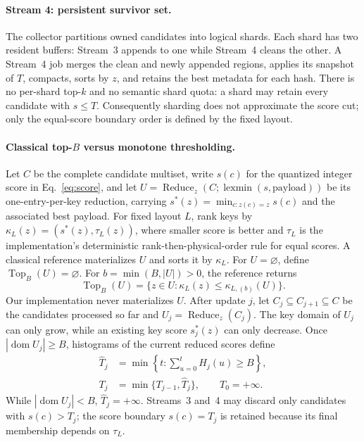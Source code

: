 \documentclass[10pt,twocolumn]{article}
\newcommand{\beam}{B}
\begin{document}
\paragraph{Stream 4: persistent survivor set.}
The collector partitions owned candidates into logical shards.  Each shard has
two resident buffers: Stream~3 appends to one while Stream~4 cleans the other.
A Stream~4 job merges the clean and newly appended regions, applies its snapshot
of $T$, compacts, sorts by $z$, and retains the best metadata for each hash.
There is no per-shard top-$k$ and no semantic shard quota: a shard may retain
every candidate with $s\leq T$. Consequently sharding does not approximate the
score cut; only the equal-score boundary order is defined by the fixed layout.

\paragraph{Classical top-$\beam$ versus monotone thresholding.}
Let $C$ be the complete candidate multiset, write $s(c)$ for the quantized
integer score in Eq.~\eqref{eq:score}, and let
$U=\operatorname{Reduce}_{z}(C;\operatorname{lexmin}(s,\mathrm{payload}))$ be
its one-entry-per-key reduction, carrying
$s^*(z)=\min_{c:z(c)=z}s(c)$ and the associated best payload.  For fixed layout
$L$, rank keys by $\kappa_L(z)=(s^*(z),\tau_L(z))$, where smaller score is
better and $\tau_L$ is the implementation's deterministic
rank-then-physical-order rule for equal scores.  A classical reference
materializes $U$ and sorts it by $\kappa_L$.
For $U=\varnothing$, define $\operatorname{Top}_{\beam}(U)=\varnothing$.
For $b=\min(\beam,|U|)>0$, the reference returns
\begin{equation}
 \operatorname{Top}_{\beam}(U)=
 \{z\in U:\kappa_L(z)\leq \kappa_{L,(b)}(U)\}.
 \label{eq:classical_topb}
\end{equation}
Our implementation never materializes $U$.  After update $j$, let
$C_j\subseteq C_{j+1}\subseteq C$ be the candidates processed so far and
$U_j=\operatorname{Reduce}_{z}(C_j)$.  The key domain of $U_j$ can only grow,
while an existing key score $s_j^*(z)$ can only decrease.  Once
$|\operatorname{dom}U_j|\geq\beam$, histograms of the current reduced scores
define
\begin{align}
 \widehat T_j&=\min\left\{t:\sum_{u=0}^{t}H_j(u)\geq\beam\right\},\nonumber\\
 T_j&=\min\{T_{j-1},\widehat T_j\},\qquad T_0=+\infty.
 \label{eq:online_threshold}
\end{align}
While $|\operatorname{dom}U_j|<\beam$, $\widehat T_j=+\infty$.
Streams~3 and~4 may discard only candidates with $s(c)>T_j$; the score boundary
$s(c)=T_j$ is retained because its final membership depends on $\tau_L$.
\end{document}
